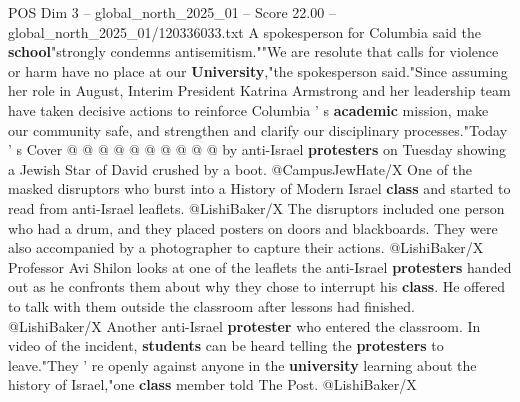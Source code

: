 \begin{textsample}{POS Dim 3 – global\_north\_2025\_01 – Score 22.00 – global\_north\_2025\_01/120336033.txt}
A spokesperson for Columbia said the \textbf{school}"strongly condemns antisemitism.""We are resolute that calls for violence or harm have no place at our \textbf{University},"the spokesperson said."Since assuming her role in August, Interim President Katrina Armstrong and her leadership team have taken decisive actions to reinforce Columbia ' s \textbf{academic} mission, make our community safe, and strengthen and clarify our disciplinary processes."Today ' s Cover @ @ @ @ @ @ @ @ @ @ by anti-Israel \textbf{protesters} on Tuesday showing a Jewish Star of David crushed by a boot. @CampusJewHate/X One of the masked disruptors who burst into a History of Modern Israel \textbf{class} and started to read from anti-Israel leaflets. @LishiBaker/X The disruptors included one person who had a drum, and they placed posters on doors and blackboards.
They were also accompanied by a photographer to capture their actions. @LishiBaker/X Professor Avi Shilon looks at one of the leaflets the anti-Israel \textbf{protesters} handed out as he confronts them about why they chose to interrupt his \textbf{class}.
He offered to talk with them outside the classroom after lessons had finished. @LishiBaker/X Another anti-Israel \textbf{protester} who entered the classroom.
In video of the incident, \textbf{students} can be heard telling the \textbf{protesters} to leave."They ' re openly against anyone in the \textbf{university} learning about the history of Israel,"one \textbf{class} member told The Post. @LishiBaker/X

\end{textsample}

